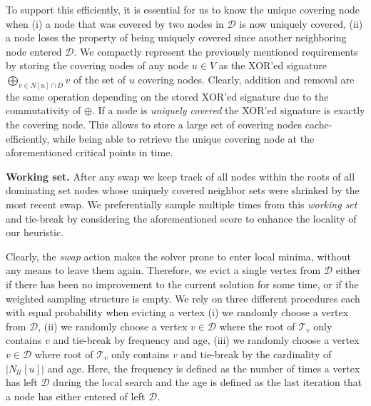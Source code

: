 \documentclass[a4paper, USenglish, cleveref, autoref, thm-restate, noalgorithm2e]{socg-lipics-v2021}
\newcommand{\domset}{\ensuremath{\mathcal D}\xspace}
\newcommand{\uniquelycovered}{\ensuremath{\mathcal U}\xspace}
\newcommand{\intersectiontree}{\ensuremath{\mathcal T}\xspace}
\begin{document}
%
To support this efficiently, it is essential for us to know the unique covering node when (i) a node that was covered by two nodes in $\domset$ is now uniquely covered, (ii) a node loses the property of being uniquely covered since another neighboring node entered $\domset$.
%
We compactly represent the previously mentioned requirements by storing the covering nodes of any node $u \in V$ as the XOR'ed signature $\bigoplus_{v \in N[u]\cap D} v$ of the set of $u$ covering nodes.
%
Clearly, addition and removal are the same operation depending on the stored XOR'ed signature due to the commutativity of $\oplus$.
%
If a node is \textit{uniquely covered} the XOR'ed signature is exactly the covering node.
%
This allows to store a large set of covering nodes cache-efficiently, while being able to retrieve the unique covering node at the aforementioned critical points in time. 

\textbf{Working set.} After any swap we keep track of all nodes within the roots of all dominating set nodes whose uniquely covered neighbor sets were shrinked by the most recent swap.
%
We preferentially sample multiple times from this \textit{working set} and tie-break by considering the aforementioned score to enhance the locality of our heuristic.

Clearly, the \textit{swap} action makes the solver prone to enter local minima, without any means to leave them again.
%
Therefore, we evict a single vertex from $\domset$ either if there has been no improvement to the current solution for some time, or if the weighted sampling structure is empty.
%
We rely on three different procedures each with equal probability when evicting a vertex (i) we randomly choose a vertex from $\domset$, (ii) we randomly choose a vertex $v \in \domset$ where the root of $\intersectiontree_v$ only contains $v$ and tie-break by frequency and age, (iii) we randomly choose a vertex $v \in \domset$ where root of $\intersectiontree_v$ only contains $v$ and tie-break by the cardinality of $|N_{\uniquelycovered}[u]|$ and age.
%
Here, the frequency is defined as the number of times a vertex has left $\domset$ during the local search and the age is defined as the last iteration that a node has either entered of left $\domset$.   










\end{document}
